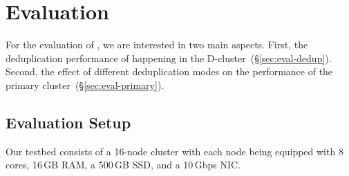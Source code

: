 \section{ Evaluation}
\label{sec:Evaluation}

For the evaluation of \sysname, we are interested in two main aspects. First, the deduplication
performance of \sysname happening in the D-cluster~(\S\ref{sec:eval-dedup}).
Second, the effect of different deduplication modes on the performance of the primary cluster~(\S\ref{sec:eval-primary}).


\subsection{Evaluation Setup}

Our testbed consists of 
a 16-node cluster with
each node being equipped with 8 cores, 16\,GB RAM, a 500\,GB SSD, and a 10\,Gbps NIC. 


